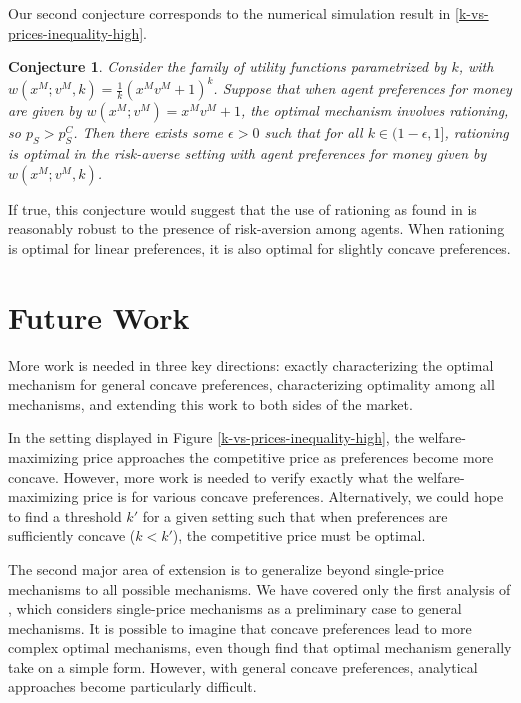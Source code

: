 \documentclass[AER]{AEA}
\newtheorem{conj}[theorem]{Conjecture}
\begin{document}
Our second conjecture corresponds to the numerical simulation result in \ref{k-vs-prices-inequality-high}.

\begin{conj}
    \label{conj:rationing-robust}
    Consider the family of utility functions parametrized by $k$, with $w(x^M; v^M, k) = \frac{1}{k}(x^M v^M + 1)^k$. Suppose that when agent preferences for money are given by $w(x^M; v^M) = x^M v^M + 1$, the optimal mechanism involves rationing, so $p_S > p_S^C$. Then there exists some $\epsilon > 0$ such that for all $k \in (1-\epsilon, 1]$, rationing is optimal in the risk-averse setting with agent preferences for money given by $w(x^M; v^M, k)$.
\end{conj}

If true, this conjecture would suggest that the use of rationing as found in \cite{dworczak-2020} is reasonably robust to the presence of risk-aversion among agents. When rationing is optimal for linear preferences, it is also optimal for slightly concave preferences.

\section{Future Work}
\label{sec:future-work}

More work is needed in three key directions: exactly characterizing the optimal mechanism for general concave preferences, characterizing optimality among all mechanisms, and extending this work to both sides of the market.

In the setting displayed in Figure \ref{k-vs-prices-inequality-high}, the welfare-maximizing price approaches the competitive price as preferences become more concave. However, more work is needed to verify exactly what the welfare-maximizing price is for various concave preferences. Alternatively, we could hope to find a threshold $k'$ for a given setting such that when preferences are sufficiently concave ($k < k'$), the competitive price must be optimal.

The second major area of extension is to generalize beyond single-price mechanisms to all possible mechanisms. We have covered only the first analysis of \cite{dworczak-2020}, which considers single-price mechanisms as a preliminary case to general mechanisms. It is possible to imagine that concave preferences lead to more complex optimal mechanisms, even though \cite{dworczak-2020} find that optimal mechanism generally take on a simple form. However, with general concave preferences, analytical approaches become particularly difficult. 
\end{document}
